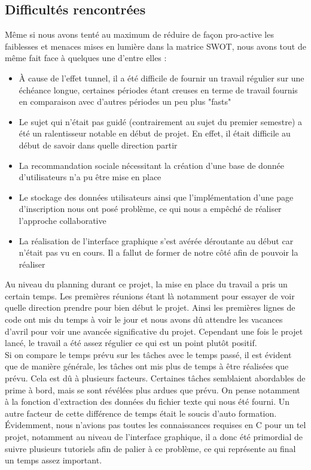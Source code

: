 \documentclass[light]{ceri}
\begin{document}
\subsection{Difficultés rencontrées}
Même si nous avons tenté au maximum de réduire de façon pro-active les faiblesses et menaces mises en lumière dans la matrice SWOT, nous avons tout de même fait face à quelques une d'entre elles : \\

\begin{itemize}
    \item À cause de l'effet tunnel, il a été difficile de fournir un travail régulier sur une échéance longue, certaines périodes étant creuses en terme de travail fournis en comparaison avec d'autres périodes un peu plus "fasts"
    
    \item Le sujet qui n'était pas guidé (contrairement au sujet du premier semestre) a été un ralentisseur notable en début de projet. En effet, il était difficile au début de savoir dans quelle direction partir
    
    \item La recommandation sociale nécessitant la création d'une base de donnée d'utilisateurs n'a pu être mise en place
    
    \item Le stockage des données utilisateurs ainsi que l'implémentation d'une page d'inscription nous ont posé problème, ce qui nous a empêché de réaliser l'approche collaborative
    
    \item La réalisation de l'interface graphique s'est avérée déroutante au début car n'était pas vu en cours. Il a fallut de former de notre côté afin de pouvoir la réaliser\\
\end{itemize}

Au niveau du planning durant ce projet, la mise en place du travail a pris un certain temps. Les premières réunions étant là notamment pour essayer de voir quelle direction prendre pour bien début le projet. Ainsi les premières lignes de code ont mis du temps à voir le jour et nous avons dû attendre les vacances d'avril pour voir une avancée significative du projet. Cependant une fois le projet lancé, le travail a été assez régulier ce qui est un point plutôt positif.\\

Si on compare le temps prévu sur les tâches avec le temps passé, il est évident que de manière générale, les tâches ont mis plus de temps à être réalisées que prévu. Cela est dû à plusieurs facteurs. Certaines tâches semblaient abordables de prime à bord, mais se sont révélées plus ardues que prévu. On pense notamment à la fonction d'extraction des données du fichier texte qui nous été fourni. Un autre facteur de cette différence de temps était le soucis d'auto formation. Évidemment, nous n'avions pas toutes les connaissances requises en C pour un tel projet, notamment au niveau de l'interface graphique, il a donc été primordial de suivre plusieurs tutoriels afin de palier à ce problème, ce qui représente au final un temps assez important.
\end{document}
